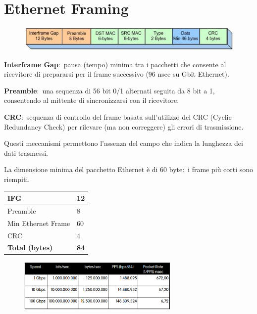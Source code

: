\section{Ethernet Framing}

\begin{figure}[H]
    \centering
    \includegraphics[width=\textwidth]{immagini/Ethernet_framing.png}
\end{figure}

\noindent \textbf{Interframe Gap}:\ pausa (tempo) minima tra i pacchetti che consente al ricevitore di prepararsi per il frame successivo (96 nsec su Gbit Ethernet).

\noindent\textbf{Preamble}:\ una sequenza di 56 bit 0/1 alternati seguita da 8 bit a 1, consentendo al mittente di sincronizzarsi con il ricevitore.

\noindent\textbf{CRC}:\ sequenza di controllo del frame basata sull'utilizzo del CRC (Cyclic Redundancy Check) per rilevare (ma non correggere) gli errori di trasmissione.

Questi meccanismi permettono l'assenza del campo che indica la lunghezza dei dati trasmessi.

La dimensione minima del pacchetto Ethernet è di 60 byte:\ i frame più corti sono riempiti.

\begin{table}[H]
    \centering
    \begin{tabular}{|l|l|}
        \hline
        IFG                    & 12          \\\hline
        Preamble               & 8           \\\hline
        Min Ethernet Frame     & 60          \\\hline
        CRC                    & 4           \\\hline
        \hline
        \textbf{Total (bytes)} & \textbf{84} \\\hline
    \end{tabular}
\end{table}

\begin{figure}[H]
    \centering
    \includegraphics[width=0.7\textwidth]{immagini/Ethernet_speed.png}
\end{figure}

